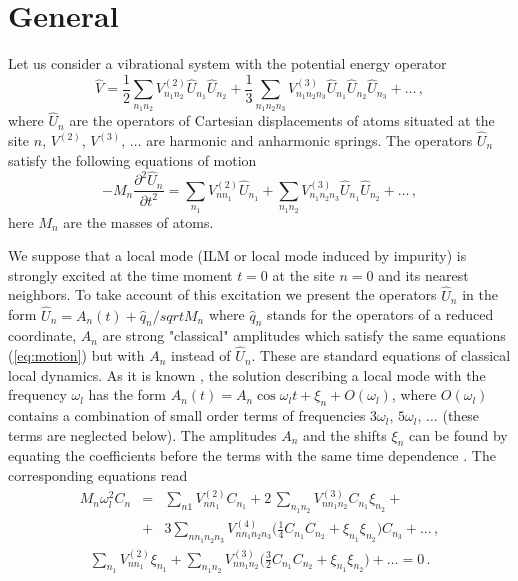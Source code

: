 \section{General}
Let us consider a vibrational system with the potential energy operator
\begin{equation}
\hat{V} = \frac{1}{2} \sum_{n_{1} n_{2}}\!{V^{(2)}_{n_{1} n_{2}}
\hat{U}_{n_{1}} \hat{U} _{n_{2}}}
+ \frac{1}{3}\! \sum_{n_{1} n_{2} n_{3}}\!\!{V^{(3)}_{n_{1} n_{2} n_{3}}
\hat{U}_{n_{1}} \hat{U}_{n_{2}} \hat{U}_{n_{3}}} + \ldots\,,
\label{eq:v}
\end{equation}
where $\hat{U}_{n}$ are the operators of Cartesian displacements of atoms 
situated at the site $n$, $V^{(2)},\, V^{(3)},\,\ldots$ are harmonic 
and anharmonic springs. The operators $\hat{U}_{n}$ satisfy the 
following equations of motion
\begin{equation}
-M_{n} \frac{\partial^{2} \hat{U}_{n}}{\partial t^{2}} = 
\sum_{n_{1}}{V^{(2)}_{n n_{1}} \hat{U}_{n_{1}}} + 
\sum_{n_{1} n_{2}}{V^{(3)}_{n_{1} n_{2} n_{3}} \hat{U}_{n_{1}}
\hat{U}_{n_{2}}} + \ldots\,, 
\label{eq:motion}
\end{equation}
here $M_{n}$ are the masses of atoms.

We suppose that a local mode (ILM or local mode induced by impurity) is
strongly excited at the time moment $t=0$ at the site $n=0$ and its nearest
neighbors. To take account of this excitation we present the operators 
$\hat{U}_{n}$ in the form $\hat{U}_{n} = A_{n}(t) + \hat{q}_{n}/sqrt{M_n}$
where $\hat{q}_{n}$ stands for the operators of a reduced coordinate, $A_{n}$ 
are strong "classical" amplitudes which satisfy the same equations 
(\ref{eq:motion}) but with $A_{n}$ instead of $\hat{U}_{n}$. These are 
standard equations of classical local dynamics. As it is known \cite{dolgov}, 
the solution describing a local mode with the frequency $\omega_{l}$ has the 
form $A_{n}(t) = A_{n} \cos{\omega_{l} t} + \xi_{n} + O(\omega_l)$, where
$O(\omega_l)$ contains a combination of small order terms of frequencies
$3\omega_{l},\, 5\omega_{l},\, \ldots$ (these terms are neglected below). The 
amplitudes $A_{n}$ and the shifts $\xi_{n}$ can be found by equating the
coefficients before the terms with the same time dependence 
\cite{dolgov,sivtak}. The corresponding equations read
\begin{eqnarray}
M_{n} \omega_{l}^{2} C_{n} &=& \sum_{n1}{V^{(2)}_{n n_{1}} C_{n_{1}}}
+ 2\,\sum_{n_{1} n_{2}}{V^{(3)}_{n n_{1} n_{2}} C_{n_{1}} \xi_{n_{2}}} +
\nonumber \\
&+& 3\sum_{n n_{1} n_{2} n_{3}}{V^{(4)}_{n n_{1} n_{2} n_{3}}
{\Big (}\frac{1}{4}C_{n_{1}} C_{n_{2}} + \xi_{n_{1}} \xi_{n_{2}}{\Big )}
C_{n_{3}}} + \ldots\,, \nonumber
\end{eqnarray}
\begin{eqnarray}
\sum_{n_{1}}{V^{(2)}_{n n_{1}} \xi_{n_{1}}} +
\sum_{n_{1} n_{2}}{V^{(3)}_{n n_{1} n_{2}} {\Big (}\frac{3}{2} C_{n_{1}}
C_{n_{2}} +
\xi_{n_{1}}
\xi_{n_{2}}{\Big )}} + \ldots = 0\,.\nonumber
\end{eqnarray}
